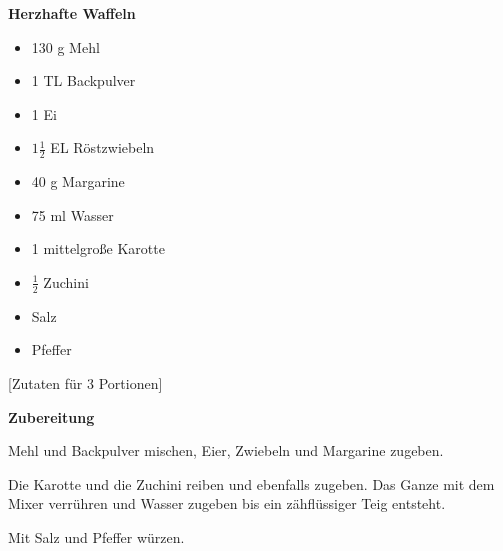 

\parindent0pt	

\pagestyle{empty}


\textbf{{\LARGE Herzhafte Waffeln}}%

\hrulefill
\vspace*{\fill}
\begin{multicols}{2}	
\begin{itemize}
\item 130 g Mehl
\item 1 TL Backpulver
\item 1 Ei
\item $1\frac{1}{2}$ EL Röstzwiebeln
\item 40 g Margarine
\item 75 ml Wasser
\item 1 mittelgroße Karotte
\item $\frac{1}{2}$ Zuchini
\item Salz
\item Pfeffer
\end{itemize}
\end{multicols}
\vfill									%

\vspace{2cm}
%
\begin{center}
%
[Zutaten für 3 Portionen]%
\end{center}


\vfill
\newpage
\textbf{{\LARGE Zubereitung}}%

\hrulefill

\vspace*{\fill}
\begin{multicols}{2}


Mehl und Backpulver mischen, Eier, Zwiebeln und Margarine zugeben.\newline

Die Karotte und die Zuchini reiben und ebenfalls zugeben. Das Ganze mit
dem Mixer verrühren und Wasser zugeben bis ein zähflüssiger Teig entsteht.\newline

Mit Salz und Pfeffer würzen.


\end{multicols}
\vfill
